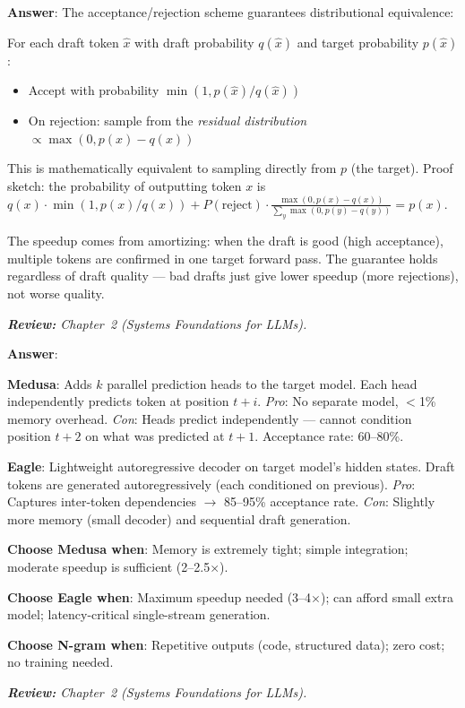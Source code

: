 \begin{questionbox}
\textbf{Answer}: The acceptance/rejection scheme guarantees distributional equivalence:

For each draft token $\hat{x}$ with draft probability $q(\hat{x})$ and target probability $p(\hat{x})$:

\begin{itemize}
  \item Accept with probability $\min(1, p(\hat{x})/q(\hat{x}))$
  \item On rejection: sample from the \emph{residual distribution} $\propto \max(0, p(x) - q(x))$
\end{itemize}

This is mathematically equivalent to sampling directly from $p$ (the target). Proof sketch: the probability of outputting token $x$ is $q(x) \cdot \min(1, p(x)/q(x)) + P(\text{reject}) \cdot \frac{\max(0, p(x)-q(x))}{\sum_y \max(0, p(y)-q(y))} = p(x)$.

The speedup comes from amortizing: when the draft is good (high acceptance), multiple tokens are confirmed in one target forward pass. The guarantee holds regardless of draft quality --- bad drafts just give lower speedup (more rejections), not worse quality.

\emph{\textbf{Review:} Chapter~2 (Systems Foundations for LLMs).}
\end{questionbox}

\begin{questionbox}
\textbf{Answer}:

\textbf{Medusa}: Adds $k$ parallel prediction heads to the target model. Each head independently predicts token at position $t+i$. \emph{Pro}: No separate model, $<$1\% memory overhead. \emph{Con}: Heads predict independently --- cannot condition position $t+2$ on what was predicted at $t+1$. Acceptance rate: 60--80\%.

\textbf{Eagle}: Lightweight autoregressive decoder on target model’s hidden states. Draft tokens are generated autoregressively (each conditioned on previous). \emph{Pro}: Captures inter-token dependencies $\to$ 85--95\% acceptance rate. \emph{Con}: Slightly more memory (small decoder) and sequential draft generation.

\textbf{Choose Medusa when}: Memory is extremely tight; simple integration; moderate speedup is sufficient (2--2.5$\times$).

\textbf{Choose Eagle when}: Maximum speedup needed (3--4$\times$); can afford small extra model; latency-critical single-stream generation.

\textbf{Choose N-gram when}: Repetitive outputs (code, structured data); zero cost; no training needed.

\emph{\textbf{Review:} Chapter~2 (Systems Foundations for LLMs).}
\end{questionbox}

